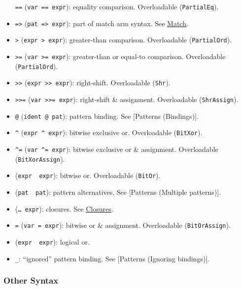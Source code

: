 \documentclass[a4paper,]{book}
\begin{document}
\begin{itemize}
  \texttt{==} (\texttt{var\ ==\ expr}): equality comparison.
  Overloadable (\texttt{PartialEq}).
\item
  \texttt{=\textgreater{}} (\texttt{pat\ =\textgreater{}\ expr}): part
  of match arm syntax. See \protect\hyperlink{sec--match}{Match}.
\item
  \texttt{\textgreater{}} (\texttt{expr\ \textgreater{}\ expr}):
  greater-than comparison. Overloadable (\texttt{PartialOrd}).
\item
  \texttt{\textgreater{}=} (\texttt{var\ \textgreater{}=\ expr}):
  greater-than or equal-to comparison. Overloadable
  (\texttt{PartialOrd}).
\item
  \texttt{\textgreater{}\textgreater{}}
  (\texttt{expr\ \textgreater{}\textgreater{}\ expr}): right-shift.
  Overloadable (\texttt{Shr}).
\item
  \texttt{\textgreater{}\textgreater{}=}
  (\texttt{var\ \textgreater{}\textgreater{}=\ expr}): right-shift \&
  assignment. Overloadable (\texttt{ShrAssign}).
\item
  \texttt{@} (\texttt{ident\ @\ pat}): pattern binding. See {[}Patterns
  (Bindings){]}.
\item
  \texttt{\^{}} (\texttt{expr\ \^{}\ expr}): bitwise exclusive or.
  Overloadable (\texttt{BitXor}).
\item
  \texttt{\^{}=} (\texttt{var\ \^{}=\ expr}): bitwise exclusive or \&
  assignment. Overloadable (\texttt{BitXorAssign}).
\item
  \texttt{\textbar{}} (\texttt{expr\ \textbar{}\ expr}): bitwise or.
  Overloadable (\texttt{BitOr}).
\item
  \texttt{\textbar{}} (\texttt{pat\ \textbar{}\ pat}): pattern
  alternatives. See {[}Patterns (Multiple patterns){]}.
\item
  \texttt{\textbar{}} (\texttt{\textbar{}\ldots{}\textbar{}\ expr}):
  closures. See \protect\hyperlink{sec--closures}{Closures}.
\item
  \texttt{\textbar{}=} (\texttt{var\ \textbar{}=\ expr}): bitwise or \&
  assignment. Overloadable (\texttt{BitOrAssign}).
\item
  \texttt{\textbar{}\textbar{}}
  (\texttt{expr\ \textbar{}\textbar{}\ expr}): logical or.
\item
  \texttt{\_}: ``ignored'' pattern binding. See {[}Patterns (Ignoring
  bindings){]}.
\end{itemize}

\subsubsection{Other Syntax}\label{other-syntax}
\end{document}
